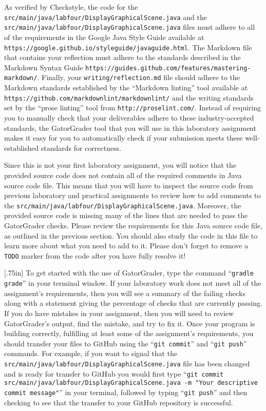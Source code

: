 \documentclass[11pt]{article}
\newcommand{\mainprogramsource}{\lstinline{src/main/java/labfour/DisplayGraphicalScene.java}}
\newcommand{\secondprogramsource}{\lstinline{src/main/java/labfour/DisplayGraphicalScene.java}}
\newcommand{\reflection}{\lstinline{writing/reflection.md}}
\newcommand{\gatorgraderstart}{\command{gradle grade}}
\newcommand{\gitcommit}{\command{git commit}}
\newcommand{\gitpush}{\command{git push}}
\newcommand{\gitcommitmainprogram}{\command{git commit src/main/java/labfour/DisplayGraphicalScene.java -m "Your
descriptive commit message"}}
\newcommand{\command}[1]{``\lstinline{#1}''}
\newcommand{\program}[1]{\lstinline{#1}}
\newcommand{\url}[1]{\lstinline{#1}}
\newcommand{\step}[1]{``{#1}''}
\newcommand{\caution}[1]{\null\hfill\LARGE{\faWarning{}}\newline\scriptsize{\em{#1}}}
\begin{document}
As verified by Checkstyle, the code for the \mainprogramsource{} and the \secondprogramsource{} files must adhere to all
of the requirements in the Google Java Style Guide available at
\url{https://google.github.io/styleguide/javaguide.html}. The Markdown file that contains your reflection must adhere to
the standards described in the Markdown Syntax Guide \url{https://guides.github.com/features/mastering-markdown/}.
Finally, your \reflection{} file should adhere to the Markdown standards established by the \step{Markdown linting} tool
available at \url{https://github.com/markdownlint/markdownlint/} and the writing standards set by the \step{prose
linting} tool from \url{http://proselint.com/}. Instead of requiring you to manually check that your deliverables adhere
to these industry-accepted standards, the GatorGrader tool that you will use in this laboratory assignment makes it easy
for you to automatically check if your submission meets these well-established standards for correctness.

Since this is not your first laboratory assignment, you will notice that the
provided source code does not contain all of the required comments in Java
source code file. This means that you will have to inspect the source code from
previous laboratory and practical assignments to review how to add comments to
the \mainprogramsource{}. Moreover, the provided source code is missing many of
the lines that are needed to pass the GatorGrader checks. Please review the
requirements for this Java source code file, as outlined in the previous
section. You should also study the code in this file to learn more about what
you need to add to it. Please don't forget to remove a \program{TODO} marker
from the code after you have fully resolve it!

\marginnote{\caution{Write useful commits}}[.75in] To get started with the use
of GatorGrader, type the command \gatorgraderstart{} in your terminal window. If
your laboratory work does not meet all of the assignment's requirements, then
you will see a summary of the failing checks along with a statement giving the
percentage of checks that are currently passing. If you do have mistakes in your
assignment, then you will need to review GatorGrader's output, find the mistake,
and try to fix it. Once your program is building correctly, fulfilling at least
some of the assignment's requirements, you should transfer your files to GitHub
using the \gitcommit{} and \gitpush{} commands. For example, if you want to
signal that the \mainprogramsource{} file has been changed and is ready for
transfer to GitHub you would first type \gitcommitmainprogram{} in your
terminal, followed by typing \gitpush{} and then checking to see that the
transfer to your GitHub repository is successful.
\end{document}
